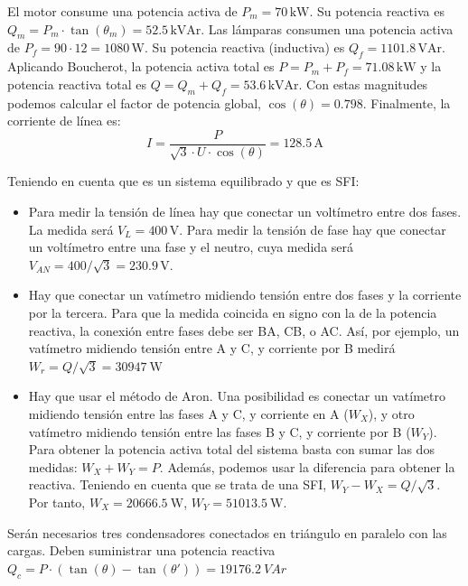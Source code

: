 El motor consume una potencia activa de $P_m = 70\,\mathrm{kW}$. Su
potencia reactiva es
$Q_m = P_m \cdot \tan(\theta_m) = 52.5\,\mathrm{kVAr}$.  Las lámparas
consumen una potencia activa de $P_f = 90 \cdot 12 =
1080\,\mathrm{W}$. Su potencia reactiva (inductiva) es
$Q_f = 1101.8\,\mathrm{VAr}$.  Aplicando Boucherot, la potencia activa
total es $P = P_m + P_f = 71.08\,\mathrm{kW}$ y la potencia reactiva
total es $Q = Q_m + Q_f = 53.6\,\mathrm{kVAr}$. Con estas magnitudes
podemos calcular el factor de potencia global, $\cos(\theta) =
0.798$. Finalmente, la corriente de línea es:
\[
  I = \frac{P}{\sqrt3 \cdot U \cdot \cos(\theta)} = 128.5\,\mathrm{A}
\]


Teniendo en cuenta que es un sistema equilibrado y que es SFI:
\begin{itemize}

\item Para medir la tensión de línea hay que conectar un voltímetro
  entre dos fases. La medida será $V_{L} = 400\,\mathrm{V}$. Para medir
  la tensión de fase hay que conectar un voltímetro entre una fase y
  el neutro, cuya medida será $V_{AN} = 400 / \sqrt{3} = 230.9\,\mathrm{V}$.

\item Hay que conectar un vatímetro midiendo tensión entre dos fases y
  la corriente por la tercera. Para que la medida coincida en signo
  con la de la potencia reactiva, la conexión entre fases debe ser BA,
  CB, o AC. Así, por ejemplo, un vatímetro midiendo tensión entre A y
  C, y corriente por B medirá $W_r = Q / \sqrt{3} = \qty{30947}{\watt}$

\item Hay que usar el método de Aron. Una posibilidad es conectar un
  vatímetro midiendo tensión entre las fases A y C, y corriente en A
  ($W_X$), y otro vatímetro midiendo tensión entre las fases B y C, y
  corriente por B ($W_Y$). Para obtener la potencia activa total del
  sistema basta con sumar las dos medidas: $W_{X} + W_{Y} =
  P$. Además, podemos usar la diferencia para obtener la
  reactiva. Teniendo en cuenta que se trata de una SFI,
  $W_Y - W_X = Q/\sqrt{3}$. Por tanto, $W_X = \SI{20666.5}{\watt}$,
  $W_Y = \SI{51013.5}{\watt}$.

\end{itemize}


Serán necesarios tres condensadores conectados en triángulo en
paralelo con las cargas. Deben suministrar una potencia reactiva
$Q_c = P \cdot (\tan(\theta) - \tan(\theta')) = \SI{19176.2}{VAr}$

